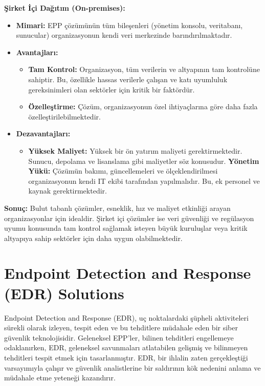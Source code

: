 \textbf{Şirket İçi Dağıtım (On-premises):}
\begin{itemize}
    \item \textbf{Mimari:} EPP çözümünün tüm bileşenleri (yönetim konsolu, veritabanı, sunucular) organizasyonun kendi veri merkezinde barındırılmaktadır.
    \item \textbf{Avantajları:}
    \begin{itemize}
        \item \textbf{Tam Kontrol:} Organizasyon, tüm verilerin ve altyapının tam kontrolüne sahiptir. Bu, özellikle hassas verilerle çalışan ve katı uyumluluk gereksinimleri olan sektörler için kritik bir faktördür.
        \item \textbf{Özelleştirme:} Çözüm, organizasyonun özel ihtiyaçlarına göre daha fazla özelleştirilebilmektedir.
    \end{itemize}
    \item \textbf{Dezavantajları:}
    \begin{itemize}
        \item \textbf{Yüksek Maliyet:} Yüksek bir ön yatırım maliyeti gerektirmektedir. Sunucu, depolama ve lisanslama gibi maliyetler söz konusudur.
        \textbf{Yönetim Yükü:} Çözümün bakımı, güncellemeleri ve ölçeklendirilmesi organizasyonun kendi IT ekibi tarafından yapılmalıdır. Bu, ek personel ve kaynak gerektirmektedir.
    \end{itemize}
\end{itemize}

\textbf{Sonuç:} Bulut tabanlı çözümler, esneklik, hız ve maliyet etkinliği arayan organizasyonlar için idealdir. Şirket içi çözümler ise veri güvenliği ve regülasyon uyumu konusunda tam kontrol sağlamak isteyen büyük kuruluşlar veya kritik altyapıya sahip sektörler için daha uygun olabilmektedir.

\section{Endpoint Detection and Response (EDR) Solutions}

Endpoint Detection and Response (EDR), uç noktalardaki şüpheli aktiviteleri sürekli olarak izleyen, tespit eden ve bu tehditlere müdahale eden bir siber güvenlik teknolojisidir. Geleneksel EPP'ler, bilinen tehditleri engellemeye odaklanırken, EDR, geleneksel savunmaları atlatabilen gelişmiş ve bilinmeyen tehditleri tespit etmek için tasarlanmıştır. EDR, bir ihlalin zaten gerçekleştiği varsayımıyla çalışır ve güvenlik analistlerine bir saldırının kök nedenini anlama ve müdahale etme yeteneği kazandırır.

